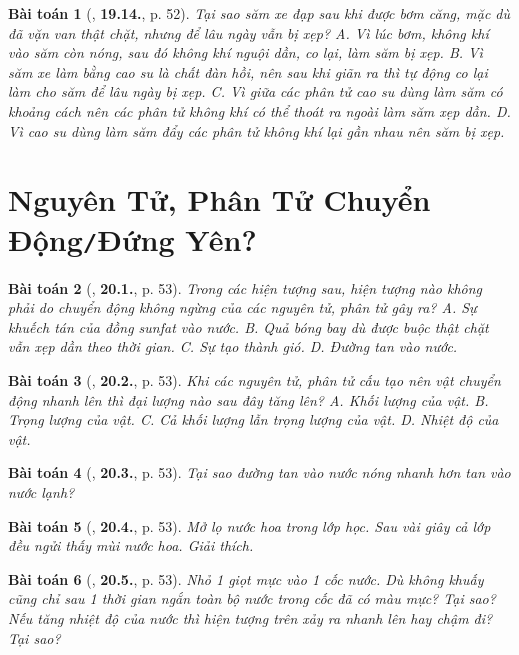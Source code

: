 \documentclass{article}
\numberwithin{equation}{section}
\newtheorem{baitoan}{Bài toán}
\begin{document}
\begin{baitoan}[\cite{SBT_Vat_Ly_8}, \textbf{19.14.}, p. 52]
	Tại sao săm xe đạp sau khi được bơm căng, mặc dù đã vặn van thật chặt, nhưng để lâu ngày vẫn bị xẹp? {\sf A.} Vì lúc bơm, không khí vào săm còn nóng, sau đó không khí nguội dần, co lại, làm săm bị xẹp. {\sf B.} Vì săm xe làm bằng cao su là chất đàn hồi, nên sau khi giãn ra thì tự động co lại làm cho săm để lâu ngày bị xẹp. {\sf C.} Vì giữa các phân tử cao su dùng làm săm có khoảng cách nên các phân tử không khí có thể thoát ra ngoài làm săm xẹp dần. {\sf D.} Vì cao su dùng làm săm đẩy các phân tử không khí lại gần nhau nên săm bị xẹp.
\end{baitoan}


\section{Nguyên Tử, Phân Tử Chuyển Động\texttt{/}Đứng Yên?}

\begin{baitoan}[\cite{SBT_Vat_Ly_8}, \textbf{20.1.}, p. 53]
	Trong các hiện tượng sau, hiện tượng nào không phải do chuyển động không ngừng của các nguyên tử, phân tử gây ra? {\sf A.} Sự khuếch tán của đồng sunfat vào nước. {\sf B.} Quả bóng bay dù được buộc thật chặt vẫn xẹp dần theo thời gian. {\sf C.} Sự tạo thành gió. {\sf D.} Đường tan vào nước.
\end{baitoan}

\begin{baitoan}[\cite{SBT_Vat_Ly_8}, \textbf{20.2.}, p. 53]
	Khi các nguyên tử, phân tử cấu tạo nên vật chuyển động nhanh lên thì đại lượng nào sau đây tăng lên? {\sf A.} Khối lượng của vật. {\sf B.} Trọng lượng của vật. {\sf C.} Cả khối lượng lẫn trọng lượng của vật. {\sf D.} Nhiệt độ của vật.
\end{baitoan}

\begin{baitoan}[\cite{SBT_Vat_Ly_8}, \textbf{20.3.}, p. 53]
	Tại sao đường tan vào nước nóng nhanh hơn tan vào nước lạnh?
\end{baitoan}

\begin{baitoan}[\cite{SBT_Vat_Ly_8}, \textbf{20.4.}, p. 53]
	Mở lọ nước hoa trong lớp học. Sau vài giây cả lớp đều ngửi thấy mùi nước hoa. Giải thích.
\end{baitoan}

\begin{baitoan}[\cite{SBT_Vat_Ly_8}, \textbf{20.5.}, p. 53]
	Nhỏ 1 giọt mực vào 1 cốc nước. Dù không khuấy cũng chỉ sau 1 thời gian ngắn toàn bộ nước trong cốc đã có màu mực? Tại sao? Nếu tăng nhiệt độ của nước thì hiện tượng trên xảy ra nhanh lên hay chậm đi? Tại sao?
\end{baitoan}
\end{document}
